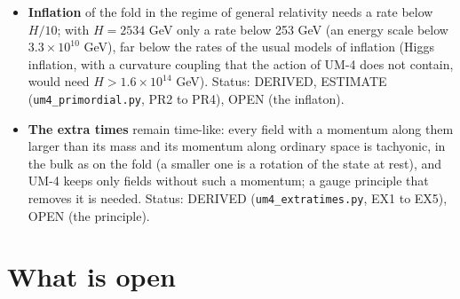 \documentclass[
  10pt,
]{article}
\begin{document}
\begin{itemize}
  the bound (\(1.2\times10^4\) GeV for
  \(q_{\mathrm{b}} = 0.99\,m_\Psi\)). A thermal relic needs a mass below
  the unitarity bound of \(9.7\times10^4\) GeV, which the lifetime
  allows only for a binding stronger than about
  \(q_{\mathrm{b}} = 0.9\,m_\Psi\); for weaker bindings the abundance
  needs a non-thermal origin. Bound to the fold by the Higgs portal or
  by the gluon condensate the particles cannot both live long enough and
  escape direct detection: the dark matter of UM-4 needs a binding of
  \(\chi\) to the fold that does not couple it to nucleons. Status:
  DERIVED, ESTIMATE (\texttt{um4\_spectra.py}, U6;
  \texttt{um4\_thermal.py}, T7 to T9), OPEN (the binding and the
  origin).
\item
  \textbf{Inflation} of the fold in the regime of general relativity
  needs a rate below \(H/10\); with \(H = 2534\) GeV only a rate below
  253 GeV (an energy scale below \(3.3\times10^{10}\) GeV), far below
  the rates of the usual models of inflation (Higgs inflation, with a
  curvature coupling that the action of UM-4 does not contain, would
  need \(H > 1.6\times10^{14}\) GeV). Status: DERIVED, ESTIMATE
  (\texttt{um4\_primordial.py}, PR2 to PR4), OPEN (the inflaton).
\item
  \textbf{The extra times} remain time-like: every field with a momentum
  along them larger than its mass and its momentum along ordinary space
  is tachyonic, in the bulk as on the fold (a smaller one is a rotation
  of the state at rest), and UM-4 keeps only fields without such a
  momentum; a gauge principle that removes it is needed. Status: DERIVED
  (\texttt{um4\_extratimes.py}, EX1 to EX5), OPEN (the principle).
\end{itemize}

\hypertarget{what-is-open}{%
\section{What is open}\label{what-is-open}}
\end{document}
